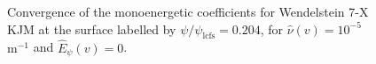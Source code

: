 \begin{figure}	
	\begin{subfigure}[b]{0.33\textwidth}
%		
	\end{subfigure}
%		
%		
	\caption{Convergence of the monoenergetic coefficients for Wendelstein 7-X KJM at the surface labelled by $\psi/\psi_{\text{lcfs}}=0.204$, for $\hat{\nu}(v)=10^{-5}$ $\text{m}^{-1}$ and $\hat{E}_\psi(v)=0$.}
\end{figure}
